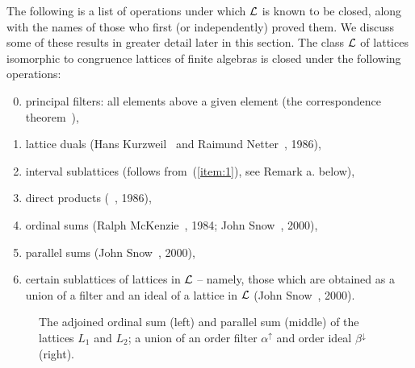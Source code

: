 The following is a list of operations under which $\mathcal{L}$ is known to be closed,
along with the names of those who first (or independently) proved them.  We
discuss some of these results in greater detail later in this section.
The class $\mathcal{L}$ of lattices isomorphic to congruence lattices of finite
algebras is closed under the following operations:
\begin{enumerate} %
\setcounter{enumi}{-1}
\item\label{item:0} principal filters: all elements above a given element (the
correspondence theorem~\cite{Bergman2012}),
\item\label{item:1} lattice duals (Hans Kurzweil~\cite{Kurzweil:1985} and Raimund Netter~\cite{Netter:1986}, 1986),
\item\label{item:2} interval sublattices (follows from~(\ref{item:1}), see Remark a. below),
\item  direct products (\Jiri \Tuma~\cite{Tuma:1986}, 1986), 
\item  ordinal sums 
  (Ralph McKenzie~\cite{McKenzie:1984}, 1984; John Snow~\cite{Snow:2000}, 2000),
\item  parallel sums (John Snow~\cite{Snow:2000}, 2000), 
\item\label{item:6} certain sublattices of lattices in $\mathcal{L}$ -- namely, those which
  are obtained as a union of a filter and an ideal of a lattice in
  $\mathcal{L}$ (John Snow~\cite{Snow:2000}, 2000). 
\end{enumerate}
\begin{center}
  \begin{figure}[h!]
    \centering
    \hskip5mm
    \hskip5mm
    \caption{The adjoined ordinal sum (left) and parallel sum (middle) 
      of the lattices $L_1$ and $L_2$; a union of an order filter
      $\alpha^\uparrow$ and order ideal $\beta^\downarrow$ (right).}
    \label{fig:ord_par_fil-uni}
  \end{figure}
\end{center}

